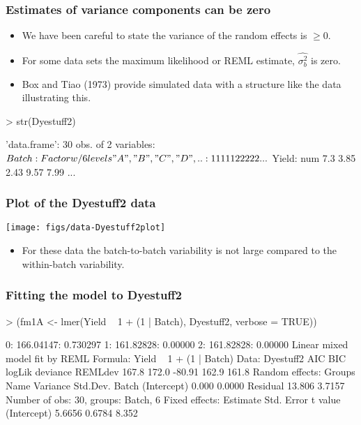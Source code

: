 \begin{frame}[fragile]
  \frametitle{Estimates of variance components can be zero}
  \begin{itemize}
  \item We have been careful to state the variance of the random
    effects is $\ge0$.
  \item For some data sets the maximum likelihood or REML estimate,
    $\widehat{\sigma_b^2}$ is zero.
  \item Box and Tiao (1973) provide simulated data with a structure
    like the  data illustrating this.
  \end{itemize}
\begin{Schunk}
\begin{Sinput}
> str(Dyestuff2)
\end{Sinput}
\begin{Soutput}
'data.frame':	30 obs. of  2 variables:
 $ Batch: Factor w/ 6 levels "A","B","C","D",..: 1 1 1 1 1 2 2 2 2 2 ...
 $ Yield: num  7.3 3.85 2.43 9.57 7.99 ...
\end{Soutput}
\end{Schunk}
\end{frame}
\begin{frame}[fragile]
  \frametitle{Plot of the Dyestuff2 data}
  \begin{center}
\texttt{[image: figs/data-Dyestuff2plot]}
  \end{center}
  \begin{itemize}
  \item For these data the batch-to-batch variability is not large
    compared to the within-batch variability.
  \end{itemize}
\end{frame}
\begin{frame}[fragile]
  \frametitle{Fitting the model to Dyestuff2}
\begin{Schunk}
\begin{Sinput}
> (fm1A <- lmer(Yield ~ 1 + (1 | Batch), Dyestuff2, verbose = TRUE))
\end{Sinput}
\begin{Soutput}
  0:     166.04147: 0.730297
  1:     161.82828:  0.00000
  2:     161.82828:  0.00000
Linear mixed model fit by REML 
Formula: Yield ~ 1 + (1 | Batch) 
   Data: Dyestuff2 
   AIC   BIC logLik deviance REMLdev
 167.8 172.0 -80.91    162.9   161.8
Random effects:
 Groups   Name        Variance Std.Dev.
 Batch    (Intercept)  0.000   0.0000  
 Residual             13.806   3.7157  
Number of obs: 30, groups: Batch, 6
Fixed effects:
            Estimate Std. Error t value
(Intercept)   5.6656     0.6784   8.352
\end{Soutput}
\end{Schunk}
\end{frame}
